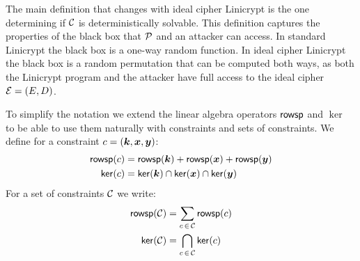 The main definition that changes with ideal cipher Linicrypt is the one determining if $\C$ is deterministically solvable.
This definition captures the properties of the black box that $\P$ and an attacker can access.
In standard Linicrypt the black box is a one-way random function.
In ideal cipher Linicrypt the black box is a random permutation that can be computed both ways,
as both the Linicrypt program and the attacker have full access to the ideal cipher $\mathcal{E} = (\E,\D)$.

To simplify the notation we extend the linear algebra operators $\rowsp$ and $\ker$
to be able to use them naturally with constraints and sets of constraints.
We define for a constraint $c = (\vk, \vx, \vy)$:
\begin{align*}
\rowsp(c) &= \rowsp(\vk) + \rowsp(\vx) + \rowsp(\vy) \\
\ker(c) &= \ker(\vk) \cap \ker(\vx) \cap \ker(\vy)
\end{align*}
For a set of constraints $\C$ we write:
\begin{align*}
\rowsp(\C) &= \sum_{c \, \in \, \C} \rowsp(c) \\
\ker(\C) &= \bigcap_{c \, \in \, \C} \ker(c)
\end{align*}

